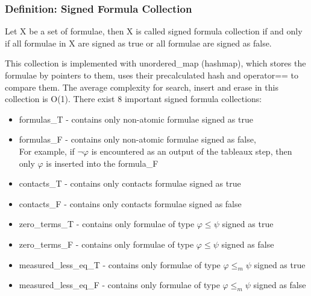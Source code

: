 \documentclass{article}
\begin{document}
		\subsubsection*{Definition: Signed Formula Collection}
			Let X be a set of formulae, then X is called signed formula collection if and only if all formulae in X are signed as true 
			or all formulae are signed as false.

			This collection is implemented with unordered\_map (hashmap),
			which stores the formulae by pointers to them, uses their precalculated hash and operator== to compare them.
			The average complexity for search, insert and erase in this collection is O(1).
		\newline
		\newline
		There exist 8 important signed formula collections:
		\begin{itemize}
			\item formulas\_T - contains only non-atomic formulae signed as true
			\item formulas\_F - contains only non-atomic formulae signed as false, \\
				For example, if $\neg\varphi$ is encountered as an output of the tableaux step, then only $\varphi$ is inserted into the formula\_F
			\item contacts\_T - contains only contacts formulae signed as true
			\item contacts\_F - contains only contacts formulae signed as false
			\item zero\_terms\_T - contains only formulae of type $\varphi \le \psi$ signed as true
			\item zero\_terms\_F - contains only formulae of type $\varphi \le \psi$ signed as false
			\item measured\_less\_eq\_T - contains only formulae of type $\varphi \le_m \psi$ signed as true
			\item measured\_less\_eq\_F - contains only formulae of type $\varphi \le_m \psi$ signed as false
		\end{itemize}
\end{document}
